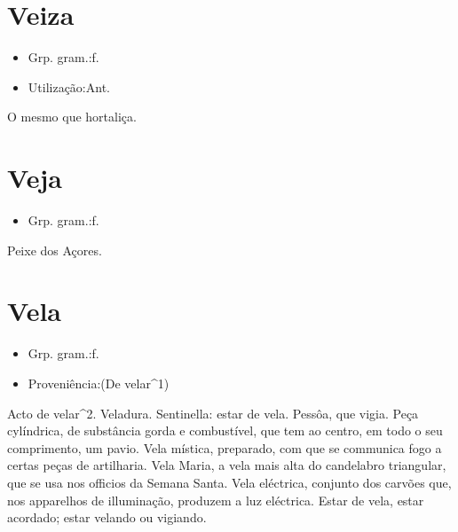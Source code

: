 \documentclass{article}
\begin{document}
\section{Veiza}
\begin{itemize}
\item {Grp. gram.:f.}
\end{itemize}
\begin{itemize}
\item {Utilização:Ant.}
\end{itemize}
O mesmo que \textunderscore hortaliça\textunderscore .
\section{Veja}
\begin{itemize}
\item {Grp. gram.:f.}
\end{itemize}
Peixe dos Açores.
\section{Vela}
\begin{itemize}
\item {Grp. gram.:f.}
\end{itemize}
\begin{itemize}
\item {Proveniência:(De \textunderscore velar\textunderscore ^1)}
\end{itemize}
Acto de velar^2.
Veladura.
Sentinella: \textunderscore estar de vela\textunderscore .
Pessôa, que vigia.
Peça cylíndrica, de substância gorda e combustível, que tem ao centro, em todo o seu comprimento, um pavio.
\textunderscore Vela mística\textunderscore , preparado, com que se communica fogo a certas peças de artilharia.
\textunderscore Vela Maria\textunderscore , a vela mais alta do candelabro triangular, que se usa nos officios da Semana Santa.
\textunderscore Vela eléctrica\textunderscore , conjunto dos carvões que, nos apparelhos de illuminação, produzem a luz eléctrica.
\textunderscore Estar de vela\textunderscore , estar acordado; estar velando ou vigiando.
\end{document}
